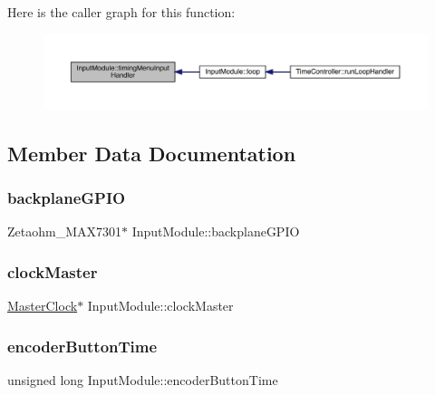 Here is the caller graph for this function\+:
\nopagebreak
\begin{figure}[H]
\begin{center}
\leavevmode
\includegraphics[width=350pt]{class_input_module_ab5048e031568fa6879b6618e4478cc97_icgraph}
\end{center}
\end{figure}


\subsection{Member Data Documentation}
\mbox{\label{class_input_module_a433abde922dee6f2abed80710f49a294}} 
\subsubsection{\texorpdfstring{backplane\+G\+P\+IO}{backplaneGPIO}}
{\footnotesize\ttfamily Zetaohm\+\_\+\+M\+A\+X7301$\ast$ Input\+Module\+::backplane\+G\+P\+IO}

\mbox{\label{class_input_module_aff739621e5d47367263551f43d98b94b}} 
\subsubsection{\texorpdfstring{clock\+Master}{clockMaster}}
{\footnotesize\ttfamily \hyperlink{class_master_clock}{Master\+Clock}$\ast$ Input\+Module\+::clock\+Master}

\mbox{\label{class_input_module_a56b62ba8836c0fb6ed93ca126bf9a02d}} 
\subsubsection{\texorpdfstring{encoder\+Button\+Time}{encoderButtonTime}}
{\footnotesize\ttfamily unsigned long Input\+Module\+::encoder\+Button\+Time}

